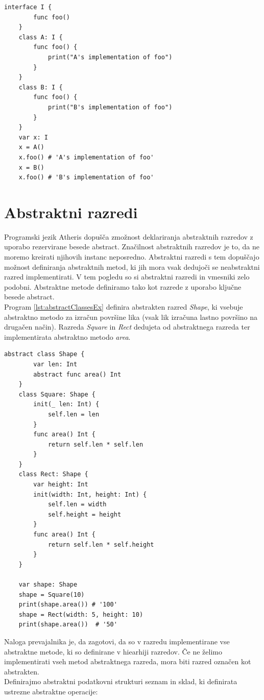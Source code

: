 \documentclass[a4paper, 12p]{book}
\begin{document}
\begin{lstlisting}[caption={}, label={lst:interfaces}, captionpos=b]
	interface I {
	    func foo()
	}
	class A: I {
	    func foo() {
	        print("A's implementation of foo")
	    }
	}
	class B: I {
	    func foo() {
	        print("B's implementation of foo")
	    }
	}
	var x: I
	x = A()
	x.foo() # 'A's implementation of foo'
	x = B()
	x.foo() # 'B's implementation of foo'
\end{lstlisting}

\section{Abstraktni razredi}

Programski jezik Atheris dopušča zmožnost deklariranja abstraktnih razredov z uporabo rezervirane besede {\ttfamily abstract}. Značilnost abstraktnih razredov je to, da ne moremo kreirati njihovih instanc neposredno. Abstraktni razredi s tem dopuščajo možnost definiranja abstraktnih metod, ki jih mora vsak dedujoči se neabstraktni razred implementirati. V tem pogledu so si abstraktni razredi in vmesniki zelo podobni. Abstraktne metode definiramo tako kot razrede z uporabo ključne besede {\ttfamily abstract}. \\
\indent Program \ref{lst:abstractClassesEx} definira abstrakten razred \textit{Shape}, ki vsebuje abstraktno metodo za izračun površine lika (vsak lik izračuna lastno površino na drugačen način). Razreda \textit{Square} in \textit{Rect} dedujeta od abstraktnega razreda ter implementirata abstraktno metodo \textit{area}.

\begin{lstlisting}[caption={Primer uporabe abstraktnih razredov.}, captionpos=b, label={lst:abstractClassesEx}]
	abstract class Shape {
	    var len: Int
	    abstract func area() Int
	}
	class Square: Shape {
	    init(_ len: Int) {
	        self.len = len
	    }
	    func area() Int {
	        return self.len * self.len
	    }
	}
	class Rect: Shape {
	    var height: Int
	    init(width: Int, height: Int) {
	        self.len = width
	        self.height = height
	    }
	    func area() Int {
	        return self.len * self.height
	    }
	}
	
	var shape: Shape
	shape = Square(10)
	print(shape.area()) # '100'
	shape = Rect(width: 5, height: 10)
	print(shape.area())  # '50'
\end{lstlisting}

Naloga prevajalnika je, da zagotovi, da so v razredu implementirane vse abstraktne metode, ki so definirane v hiearhiji razredov. Če ne želimo implementirati vseh metod abstraktnega razreda, mora biti razred označen kot abstrakten. \\
\indent Definirajmo abstraktni podatkovni strukturi seznam in sklad, ki definirata ustrezne abstraktne operacije:
\end{document}
